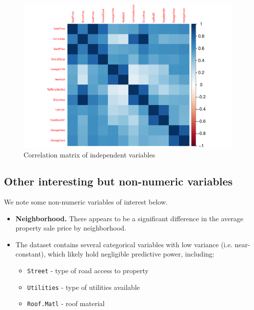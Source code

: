 \documentclass[aoas]{imsart}
\numberwithin{equation}{section}
\theoremstyle{plain}
\theoremstyle{remark}
\begin{document}
\begin{figure}
\centering
\includegraphics{STAT-444-FINAL-PROJECT-PROPOSAL_files/figure-latex/unnamed-chunk-8-1.pdf}
\caption{Correlation matrix of independent variables\label{}}
\end{figure}

\hfill\break

\hypertarget{other-interesting-but-non-numeric-variables}{%
\subsection{Other interesting but non-numeric
variables}\label{other-interesting-but-non-numeric-variables}}

\hfill\break
\hfill\break
We note some non-numeric variables of interest below.

\begin{itemize}
    \item \textbf{Neighborhood.} There appears to be a significant difference in the average property sale price by neighborhood.
\vspace{0.2cm}
\item The dataset contains several categorical variables with low variance (i.e. near-constant), which likely hold negligible predictive power, including:
\vspace{0.2cm}
\begin{itemize}
    \item \texttt{Street} - type of road access to property
    \item \texttt{Utilities} - type of utilities available
    \item \texttt{Roof.Matl} - roof material
\end{itemize}
\end{itemize}
\end{document}
